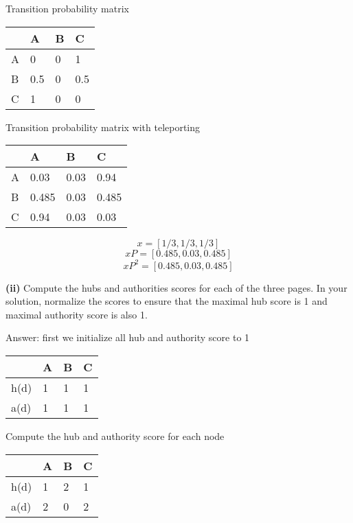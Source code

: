 \documentclass[11pt,a4paper]{report}
\begin{document}
\begin{multicols*}{2}
\noindent Transition probability matrix
\begin{center}
\begin{tabular}{ |l|l|l|l| } 
    \hline
      & A    & B  & C \\
    \hline 
    A & 0    & 0  & 1  \\
    B & 0.5  & 0  & 0.5  \\
    C & 1    & 0  & 0  \\
    \hline
\end{tabular}
\end{center}

\noindent Transition probability matrix with teleporting
\begin{center}
\begin{tabular}{ |l|l|l|l| } 
    \hline
      & A    & B    & C      \\
    \hline 
    A & 0.03  & 0.03 & 0.94  \\
    B & 0.485 & 0.03 & 0.485 \\
    C & 0.94  & 0.03 & 0.03  \\
    \hline
\end{tabular}
\end{center}

$$x = [1/3,1/3,1/3]$$
$$xP = [0.485, 0.03, 0.485]$$
$$xP^2 = [0.485, 0.03, 0.485]$$

\noindent \textbf{(ii)} Compute the hubs and authorities scores for each of the three pages. In your solution, normalize the scores to ensure that the maximal hub score is 1 and maximal authority score is also 1.

\noindent Answer: first we initialize all hub and authority score to 1
\begin{center}
\begin{tabular}{ |l|l|l|l| } 
    \hline
         & A & B & C \\
    \hline 
    h(d) & 1 & 1 & 1 \\
    a(d) & 1 & 1 & 1 \\
    \hline
\end{tabular}
\end{center}

\noindent Compute the hub and authority score for each node
\begin{center}
\begin{tabular}{ |l|l|l|l| } 
    \hline
         & A & B & C \\
    \hline 
    h(d) & 1 & 2 & 1 \\
    a(d) & 2 & 0 & 2 \\
    \hline
\end{tabular}
\end{center}


\end{multicols*}
\end{document}
